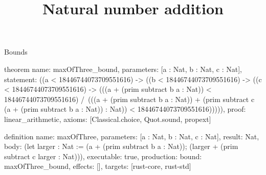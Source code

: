 \begin{lexlean}{Bounds}
\title{Natural number addition}
\begin{semanticmodule}
theorem{
  name: maxOfThree_bound,
  parameters: [a : Nat, b : Nat, c : Nat],
  statement: ((a < 18446744073709551616) -> ((b < 18446744073709551616) -> ((c < 18446744073709551616) -> (((a + (prim subtract b a : Nat)) < 18446744073709551616) /\ (((a + (prim subtract b a : Nat)) + (prim subtract c (a + (prim subtract b a : Nat)) : Nat)) < 18446744073709551616))))),
  proof: linear_arithmetic{},
  axioms: [Classical.choice, Quot.sound, propext]
}

definition{
  name: maxOfThree,
  parameters: [a : Nat, b : Nat, c : Nat],
  result: Nat,
  body: (let larger : Nat := (a + (prim subtract b a : Nat)); (larger + (prim subtract c larger : Nat))),
  executable: true,
  production: {bound: maxOfThree_bound, effects: [], targets: [rust-core, rust-std]}
}
\end{semanticmodule}
\end{lexlean}
